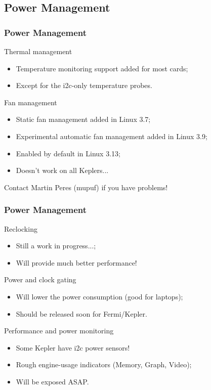 \documentclass[11pt,english,compress]{beamer}
\begin{document}
\subsection{Power Management}

\begin{frame}
	\frametitle{Power Management}

	\begin{block}{Thermal management}
		\begin{itemize}
			\item Temperature monitoring support added for most cards;
			\item Except for the i2c-only temperature probes.
		\end{itemize}
	\end{block}

	\begin{block}{Fan management}
		\begin{itemize}
			\item Static fan management added in Linux 3.7;
			\item Experimental automatic fan management added in
Linux 3.9;
			\item Enabled by default in Linux 3.13;
			\item Doesn't work on all Keplers...
		\end{itemize}
	\end{block}

	\begin{block}{}
		Contact Martin Peres (mupuf) if you have problems!
	\end{block}
\end{frame}

\begin{frame}
	\frametitle{Power Management}

	\begin{block}{Reclocking}
		\begin{itemize}
			\item Still a work in progress...;
			\item Will provide much better performance!
		\end{itemize}
	\end{block}

	\begin{block}{Power and clock gating}
		\begin{itemize}
			\item Will lower the power consumption (good for
laptops);
			\item Should be released soon for Fermi/Kepler.
		\end{itemize}
	\end{block}

	\begin{block}{Performance and power monitoring}
		\begin{itemize}
			\item Some Kepler have i2c power sensors!
			\item Rough engine-usage indicators (Memory, Graph,
Video);
			\item Will be exposed ASAP.
		\end{itemize}
	\end{block}
\end{frame}
\end{document}
